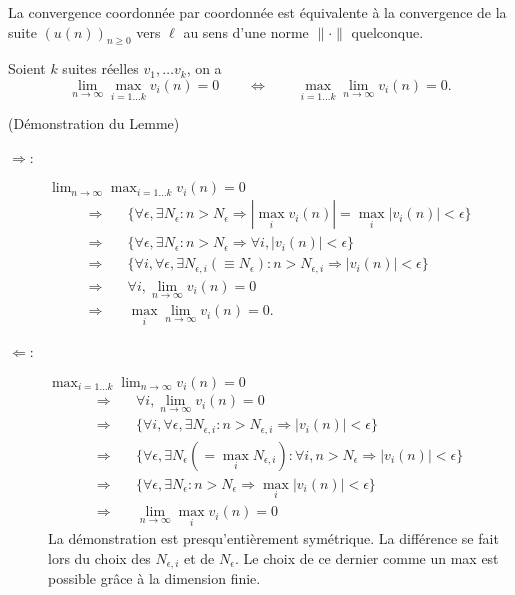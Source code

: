 \begin{proposition} \label{prop:convergenceParCoordonnee}
  La convergence coordonnée par coordonnée est équivalente à la convergence de la suite $(u(n))_{n \geq 0}$ vers $\ell$ au sens d'une norme $\|\cdot\|$ quelconque.
\end{proposition}

\begin{lemma} \label{lem:inversionLimiteMaximum}
  Soient $k$ suites réelles $v_1, \dots v_k$, on a
  $$
  \lim_{n \to \infty} \max_{i=1 \dots k} v_i(n) = 0
  \qquad \Leftrightarrow \qquad
  \max_{i=1 \dots k} \lim_{n \to \infty} v_i(n) = 0.
  $$
\end{lemma}

\proof (Démonstration du Lemme)
\begin{description}
  \item[$\Rightarrow$:] $\lim_{n \to \infty} \max_{i=1 \dots k} v_i(n) = 0$
  \begin{align*}
    \Rightarrow \quad & \{\forall \epsilon, \exists N_\epsilon: n > N_\epsilon \Rightarrow |\max_i v_i(n)| = \max_i |v_i(n)| < \epsilon\} \\
    \Rightarrow \quad & \{\forall \epsilon, \exists N_\epsilon: n > N_\epsilon \Rightarrow \forall i, |v_i(n)| < \epsilon\} \\
    \Rightarrow \quad & \{\forall i, \forall \epsilon, \exists N_{\epsilon, i}(\equiv N_\epsilon): n > N_{\epsilon, i} \Rightarrow |v_i(n)| < \epsilon\} \\
    \Rightarrow \quad & \forall i, \lim_{n \to \infty} v_i(n) = 0 \\
    \Rightarrow \quad & \max_i \lim_{n \to \infty} v_i(n) = 0.
  \end{align*}
  \item[$\Leftarrow$:] $\max_{i=1 \dots k} \lim_{n \to \infty} v_i(n) = 0$
  \begin{align*}
    \Rightarrow \quad & \forall i, \lim_{n \to \infty} v_i(n) = 0 \\
    \Rightarrow \quad & \{\forall i, \forall \epsilon, \exists N_{\epsilon, i}: n > N_{\epsilon, i} \Rightarrow |v_i(n)| < \epsilon\}\\
    \Rightarrow \quad & \{\forall \epsilon, \exists N_\epsilon (= \max_i N_{\epsilon, i}): \forall i, n > N_\epsilon \Rightarrow |v_i(n)| < \epsilon\}\\
    \Rightarrow \quad & \{\forall \epsilon, \exists N_\epsilon: n > N_\epsilon \Rightarrow \max_i |v_i(n)| < \epsilon\}\\
    \Rightarrow \quad & \lim_{n \to \infty} \max_i v_i(n) = 0
  \end{align*}
  La démonstration est presqu'entièrement symétrique. La différence se fait lors du choix des $N_{\epsilon, i}$ et de $N_\epsilon$. Le choix de ce dernier comme un max est possible grâce à la dimension finie.
\end{description}
\eproof

